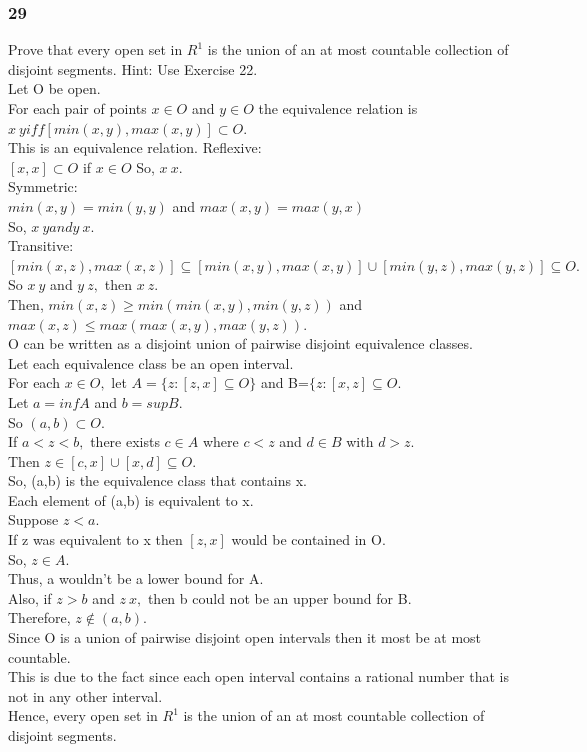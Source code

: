 \subsubsection*{29}
Prove that every open set in $R^1$ is the union of an at most countable collection of disjoint segments. Hint: Use Exercise 22. \\ 
Let O be open. \\ 
For each pair of points $x \in O$ and $y \in O$ the equivalence relation is $ x ~ y iff [min(x,y),max(x,y)] \subset O.$\\ 
This is an equivalence relation.
Reflexive: \\ 
$[x,x] \subset O$ if $x \in O$
So, $x ~ x$. \\ 
Symmetric: \\ 
$min(x,y)= min(y,y)$ and $max(x,y)=max(y,x)$\\
So, $x~y and y ~x.$\\ 
Transitive: \\ 
$[min(x,z),max(x,z)] \subseteq [min(x,y),max(x,y)] \cup [min(y,z),max(y,z)] \subseteq O.$ \\ 
So $x~y$ and $y~z,$ then $x~z.$\\ 
Then, $min(x,z)\geq min(min(x,y),min(y,z))$ and $max(x,z)\leq max(max(x,y),max(y,z)).$\\ 
O can be written as a disjoint union of pairwise disjoint equivalence classes. \\ 
Let each equivalence class be an open interval. \\ 
For each $x \in O,$ let $A=\{z:[z,x]\subseteq O\}$ and B=$\{z:[x,z] \subseteq O.$ \\ 
Let $a= infA$ and $b=supB.$\\
So $(a,b) \subset O.$\\ 
If $a<z<b,$ there exists $c \in A$ where $c<z$ and $d \in B$ with $d>z.$ \\ 
Then $z \in [c,x] \cup [x,d] \subseteq O.$ \\ 
So, (a,b) is the equivalence class that contains x. \\ 
Each element of (a,b) is equivalent to x. \\ 
Suppose $z<a.$\\
If z was equivalent to x then $[z,x]$ would be contained in O. \\ 
So, $z \in A.$ \\ 
Thus, a wouldn't be a lower bound for A. \\
Also, if $z>b$ and $z~x,$ then b could not be an upper bound for B. \\ 
Therefore, $z \notin (a,b).$\\ 
Since O is a union of pairwise disjoint open intervals then it most be at most countable. \\ 
This is due to the fact since each open interval contains a rational number that is not in any other interval. \\ 
Hence, every open set in $R^1$ is the union of an at most countable collection of disjoint segments. 




